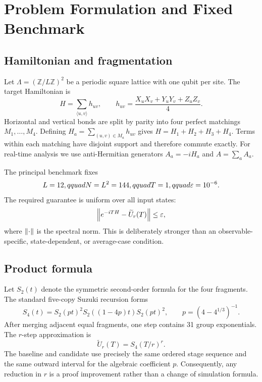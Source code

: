 \section{Problem Formulation and Fixed Benchmark}
\label{sec:problem}

\subsection{Hamiltonian and fragmentation}

Let $\Lambda=(\mathbb{Z}/L\mathbb{Z})^2$ be a periodic square lattice with one
qubit per site.  The target Hamiltonian is
\begin{equation}
 H=\sum_{\langle u,v\rangle}h_{uv},\qquad
 h_{uv}=\frac{X_uX_v+Y_uY_v+Z_uZ_v}{4}.
 \label{eq:hamiltonian}
\end{equation}
Horizontal and vertical bonds are split by parity into four perfect
matchings $M_1,\ldots,M_4$.  Defining
$H_a=\sum_{(u,v)\in M_a}h_{uv}$ gives
$H=H_1+H_2+H_3+H_4$.  Terms within each matching have disjoint support and
therefore commute exactly.  For real-time analysis we use anti-Hermitian
generators $A_a=-iH_a$ and $A=\sum_a A_a$.

The principal benchmark fixes
\begin{equation}
 L=12,qquad N=L^2=144,qquad T=1,qquad \varepsilon=10^{-6}.
 \label{eq:benchmark}
\end{equation}
The required guarantee is uniform over all input states:
\begin{equation}
 \left\lVert e^{-iTH}-\widetilde U_r(T)\right\rVert\le \varepsilon,
 \label{eq:uniformerror}
\end{equation}
where $\left\lVert \cdot\right\rVert$ is the spectral norm.  This is deliberately stronger
than an observable-specific, state-dependent, or average-case condition.

\subsection{Product formula}

Let $S_2(t)$ denote the symmetric second-order formula for the four fragments.
The standard five-copy Suzuki recursion \citep{suzuki1991general} forms
\begin{equation}
 S_4(t)=S_2(pt)^2S_2((1-4p)t)S_2(pt)^2,\qquad
 p=(4-4^{1/3})^{-1}.
 \label{eq:suzuki4}
\end{equation}
After merging adjacent equal fragments, one step contains 31 group
exponentials.  The $r$-step approximation is
\begin{equation}
 \widetilde U_r(T)=S_4(T/r)^r.
\end{equation}
The baseline and candidate use precisely the same ordered stage sequence and
the same outward interval for the algebraic coefficient $p$.  Consequently,
any reduction in $r$ is a proof improvement rather than a change of
simulation formula.

